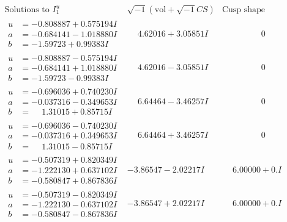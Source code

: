 \documentclass[1p]{elsarticle_modified}
\theoremstyle{definition}
\newcommand{\I}{\sqrt{-1}}
\begin{document}
$$\begin{array}{c|c|c}  
\text{Solutions to }I^u_{1}& \I (\text{vol} + \sqrt{-1}CS) & \text{Cusp shape}\\
 \hline 
\begin{aligned}
u &= -0.808887 + 0.575194 I \\
a &= -0.684141 - 1.018880 I \\
b &= -1.59723 + 0.99383 I\end{aligned}
 & \phantom{-}4.62016 + 3.05851 I & \phantom{-0.000000 } 0 \\ \hline\begin{aligned}
u &= -0.808887 - 0.575194 I \\
a &= -0.684141 + 1.018880 I \\
b &= -1.59723 - 0.99383 I\end{aligned}
 & \phantom{-}4.62016 - 3.05851 I & \phantom{-0.000000 } 0 \\ \hline\begin{aligned}
u &= -0.696036 + 0.740230 I \\
a &= -0.037316 - 0.349653 I \\
b &= \phantom{-}1.31015 + 0.85715 I\end{aligned}
 & \phantom{-}6.64464 - 3.46257 I & \phantom{-0.000000 } 0 \\ \hline\begin{aligned}
u &= -0.696036 - 0.740230 I \\
a &= -0.037316 + 0.349653 I \\
b &= \phantom{-}1.31015 - 0.85715 I\end{aligned}
 & \phantom{-}6.64464 + 3.46257 I & \phantom{-0.000000 } 0 \\ \hline\begin{aligned}
u &= -0.507319 + 0.820349 I \\
a &= -1.222130 + 0.637102 I \\
b &= -0.580847 + 0.867836 I\end{aligned}
 & -3.86547 - 2.02217 I & \phantom{-}6.00000 + 0. I\phantom{ +0.000000I} \\ \hline\begin{aligned}
u &= -0.507319 - 0.820349 I \\
a &= -1.222130 - 0.637102 I \\
b &= -0.580847 - 0.867836 I\end{aligned}
 & -3.86547 + 2.02217 I & \phantom{-}6.00000 + 0. I\phantom{ +0.000000I} \\ \hline\begin{aligned}

\end{aligned}
\end{array}$$
\end{document}
